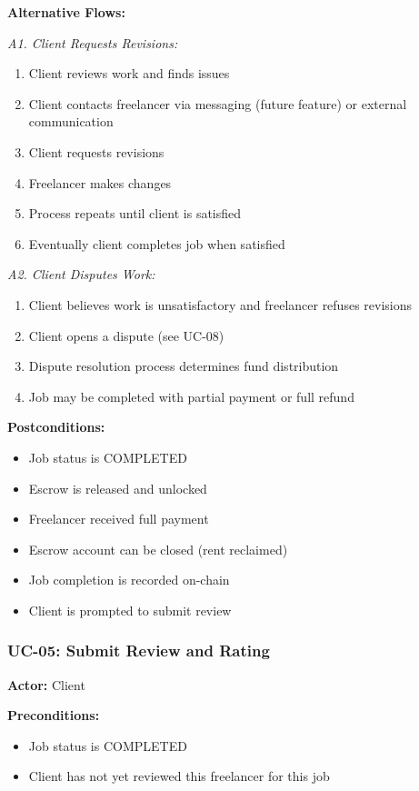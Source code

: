 \documentclass[a4paper,13pt,twoside]{report}
\theoremstyle{definition}
\begin{document}
\textbf{Alternative Flows:}

\textit{A1. Client Requests Revisions:}
\begin{enumerate}
    \item Client reviews work and finds issues
    \item Client contacts freelancer via messaging (future feature) or external communication
    \item Client requests revisions
    \item Freelancer makes changes
    \item Process repeats until client is satisfied
    \item Eventually client completes job when satisfied
\end{enumerate}

\textit{A2. Client Disputes Work:}
\begin{enumerate}
    \item Client believes work is unsatisfactory and freelancer refuses revisions
    \item Client opens a dispute (see UC-08)
    \item Dispute resolution process determines fund distribution
    \item Job may be completed with partial payment or full refund
\end{enumerate}

\textbf{Postconditions:}
\begin{itemize}
    \item Job status is COMPLETED
    \item Escrow is released and unlocked
    \item Freelancer received full payment
    \item Escrow account can be closed (rent reclaimed)
    \item Job completion is recorded on-chain
    \item Client is prompted to submit review
\end{itemize}

\subsubsection{UC-05: Submit Review and Rating}

\textbf{Actor:} Client

\textbf{Preconditions:}
\begin{itemize}
    \item Job status is COMPLETED
    \item Client has not yet reviewed this freelancer for this job
\end{itemize}
\end{document}
